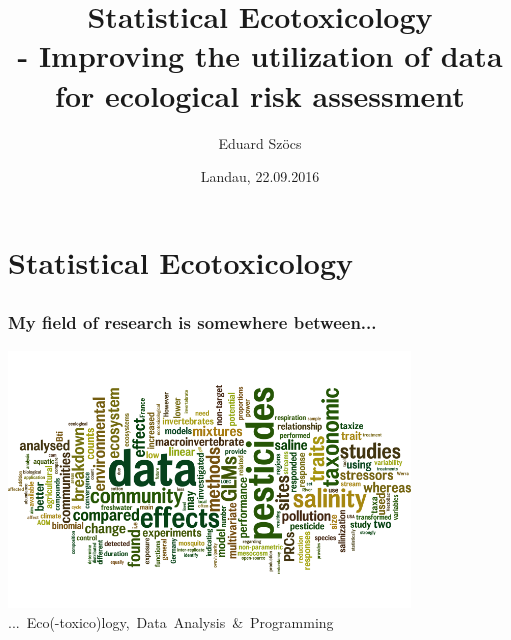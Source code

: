 \documentclass[12pt
, t
]{beamer}
\title{Statistical Ecotoxicology \\ - Improving the utilization of data for ecological risk assessment}
\author{Eduard Szöcs}
\institute{Institute for Environmental Sciences, University of Koblenz-Landau}
\date{Landau, 22.09.2016}
\begin{document}
\begin{frame}
\titlepage
\end{frame}


\section{Statistical Ecotoxicology} 
\subsection{}
\begin{frame}
\frametitle{My field of research is somewhere between...}
\center
\includegraphics[width = 0.8\textwidth]{fig/wc_all.png} \\
\mbox{... Eco(-toxico)logy, Data Analysis \& Programming}
\end{frame}

\begin{frame}[plain]
\end{frame}
\end{document}

